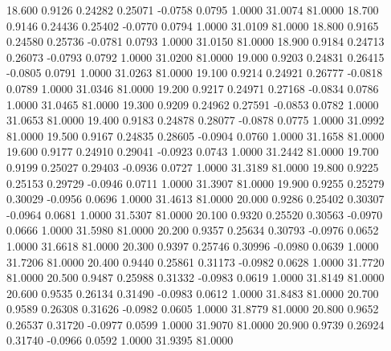   18.600   0.9126   0.24282   0.25071  -0.0758   0.0795   1.0000  31.0074  81.0000
  18.700   0.9146   0.24436   0.25402  -0.0770   0.0794   1.0000  31.0109  81.0000
  18.800   0.9165   0.24580   0.25736  -0.0781   0.0793   1.0000  31.0150  81.0000
  18.900   0.9184   0.24713   0.26073  -0.0793   0.0792   1.0000  31.0200  81.0000
  19.000   0.9203   0.24831   0.26415  -0.0805   0.0791   1.0000  31.0263  81.0000
  19.100   0.9214   0.24921   0.26777  -0.0818   0.0789   1.0000  31.0346  81.0000
  19.200   0.9217   0.24971   0.27168  -0.0834   0.0786   1.0000  31.0465  81.0000
  19.300   0.9209   0.24962   0.27591  -0.0853   0.0782   1.0000  31.0653  81.0000
  19.400   0.9183   0.24878   0.28077  -0.0878   0.0775   1.0000  31.0992  81.0000
  19.500   0.9167   0.24835   0.28605  -0.0904   0.0760   1.0000  31.1658  81.0000
  19.600   0.9177   0.24910   0.29041  -0.0923   0.0743   1.0000  31.2442  81.0000
  19.700   0.9199   0.25027   0.29403  -0.0936   0.0727   1.0000  31.3189  81.0000
  19.800   0.9225   0.25153   0.29729  -0.0946   0.0711   1.0000  31.3907  81.0000
  19.900   0.9255   0.25279   0.30029  -0.0956   0.0696   1.0000  31.4613  81.0000
  20.000   0.9286   0.25402   0.30307  -0.0964   0.0681   1.0000  31.5307  81.0000
  20.100   0.9320   0.25520   0.30563  -0.0970   0.0666   1.0000  31.5980  81.0000
  20.200   0.9357   0.25634   0.30793  -0.0976   0.0652   1.0000  31.6618  81.0000
  20.300   0.9397   0.25746   0.30996  -0.0980   0.0639   1.0000  31.7206  81.0000
  20.400   0.9440   0.25861   0.31173  -0.0982   0.0628   1.0000  31.7720  81.0000
  20.500   0.9487   0.25988   0.31332  -0.0983   0.0619   1.0000  31.8149  81.0000
  20.600   0.9535   0.26134   0.31490  -0.0983   0.0612   1.0000  31.8483  81.0000
  20.700   0.9589   0.26308   0.31626  -0.0982   0.0605   1.0000  31.8779  81.0000
  20.800   0.9652   0.26537   0.31720  -0.0977   0.0599   1.0000  31.9070  81.0000
  20.900   0.9739   0.26924   0.31740  -0.0966   0.0592   1.0000  31.9395  81.0000
